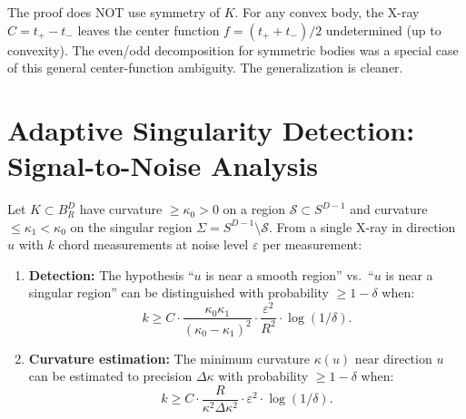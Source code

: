 \begin{remark}
The proof does NOT use symmetry of $K$. For any convex body, the X-ray $C = t_+ - t_-$ leaves the center function $f = (t_+ + t_-)/2$ undetermined (up to convexity). The even/odd decomposition for symmetric bodies was a special case of this general center-function ambiguity. The generalization is cleaner.
\end{remark}



\section{Adaptive Singularity Detection: Signal-to-Noise Analysis}

\begin{theorem}
\label{thm:detect}
Let $K \subset B_R^D$ have curvature $\geq \kappa_0 > 0$ on a region $\mathcal{S} \subset S^{D-1}$ and curvature $\leq \kappa_1 < \kappa_0$ on the singular region $\Sigma = S^{D-1} \setminus \mathcal{S}$. From a single X-ray in direction $u$ with $k$ chord measurements at noise level $\varepsilon$ per measurement:

\begin{enumerate}[label=(\alph*)]
  \item \textbf{Detection:} The hypothesis ``$u$ is near a smooth region'' vs.\ ``$u$ is near a singular region'' can be distinguished with probability $\geq 1 - \delta$ when:
  \[
    k \geq C \cdot \frac{\kappa_0 \kappa_1}{(\kappa_0 - \kappa_1)^2} \cdot \frac{\varepsilon^2}{R^2} \cdot \log(1/\delta).
  \]
  
  \item \textbf{Curvature estimation:} The minimum curvature $\kappa(u)$ near direction $u$ can be estimated to precision $\Delta\kappa$ with probability $\geq 1-\delta$ when:
  \[
    k \geq C \cdot \frac{R}{\kappa^2 \Delta\kappa^2} \cdot \varepsilon^2 \cdot \log(1/\delta).
  \]
\end{enumerate}
\end{theorem}

